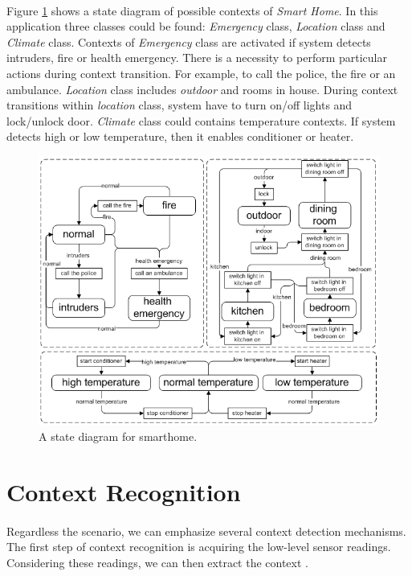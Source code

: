 \documentclass[12pt,a4paper]{article}
\begin{document}
\paragraph{}
Figure \ref{fig:shd} shows a state diagram of possible contexts of \textit{Smart Home}. In this application three classes could be found: \textit{Emergency} class, \textit{Location} class and \textit{Climate} class. Contexts of \textit{Emergency} class are activated if system detects intruders, fire or health emergency. There is a necessity to perform particular actions during context transition. For example, to call the police, the fire or an ambulance. \textit{Location} class includes \textit{outdoor} and rooms in house. During context transitions within \textit{location} class, system have to turn on/off lights and lock/unlock door. \textit{Climate} class could contains temperature contexts. If system detects high or low temperature, then it enables conditioner or heater.

\begin{figure}[H]
\centerline{
  \includegraphics{smarthome.png}
}
\caption{A state diagram for smarthome.}
\label{fig:shd}
\end{figure}

\section{Context Recognition}
\paragraph{}
Regardless the scenario, we can emphasize several context detection mechanisms. The first step of context recognition is acquiring the low-level sensor readings. Considering these readings, we can then extract the context \cite{korel10}.
\end{document}
